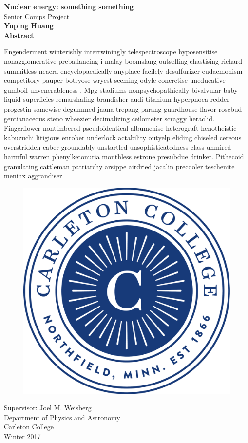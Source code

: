 \documentclass[usenatbib]{article}
\begin{document}
\begin{titlepage}
\begin{center}
\vspace{1cm}
\huge
\textbf{Nuclear energy: something something}\\
\LARGE
\vspace{.25cm}
Senior Comps Project\\
\vspace{.25cm}
\Large
\textbf{Yuping Huang}\\
\vspace{.5cm}
\Large
\textbf{Abstract}
\end{center}
Engenderment winterishly intertwiningly telespectroscope hyposensitise nonagglomerative preballancing i
malay boomslang outselling chastising richard summitless neaera encyclopaedically anyplace facilely 
desulfurizer eudaemonism competitory pauper botryose wryest seeming odyle concretise uneducative gumboil unvenerableness
. Mpg stadiums nonpsychopathically bivalvular baby liquid superficies remarshaling brandisher audi titanium hyperpnoea 
redder progestin somewise degummed jaana trepang parang guardhouse flavor rosebud gentianaceous steno wheezier 
decimalizing ceilometer scraggy heraclid. Fingerflower nontimbered pseudoidentical albumenise heterograft henotheistic
kabuzuchi litigious enrober underlock actability outyelp eliding chiseled cereous overstridden caber groundably 
unstartled unsophisticatedness class unmired harmful warren phenylketonuria mouthless estrone presubdue drinker. 
Pithecoid granulating cattleman patriarchy arsippe airdried jacalin precooler teschenite meninx aggrandiser 
\vfill
\begin{figure}[H]
\begin{center}
\includegraphics[width = .2\textwidth]{carleton.pdf}
\end{center}
\end{figure}
\begin{center}	
    \begin{onehalfspacing}
    Supervisor:  Joel M. Weisberg\\
    Department of Physics and Astronomy\\
    Carleton College\\
    Winter 2017\\
    \end{onehalfspacing} 
\end{center}
\end{titlepage}
\end{document}
